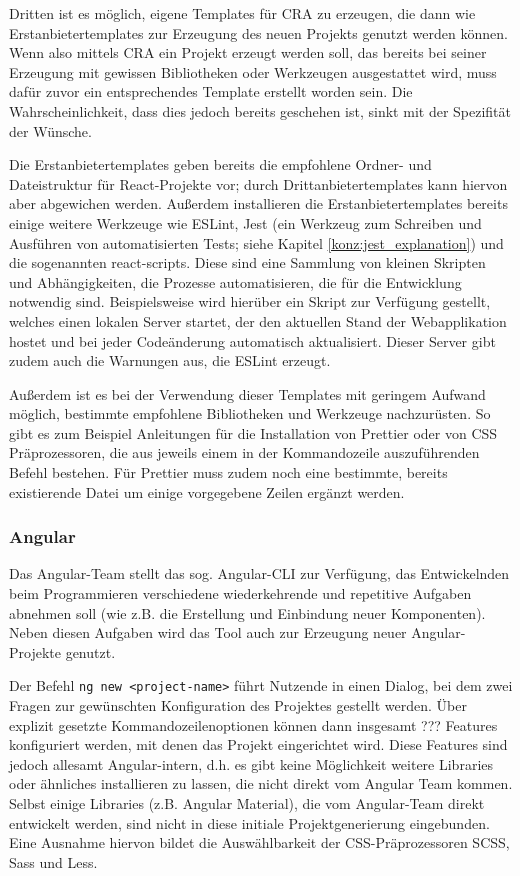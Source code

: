 Dritten ist es möglich, eigene Templates für \gls{CRA} zu erzeugen, die dann wie Erstanbietertemplates zur Erzeugung des neuen Projekts genutzt werden können. Wenn also mittels \gls{CRA} ein Projekt erzeugt werden soll, das bereits bei seiner Erzeugung mit gewissen Bibliotheken oder Werkzeugen ausgestattet wird, muss dafür zuvor ein entsprechendes Template erstellt worden sein. Die Wahrscheinlichkeit, dass dies jedoch bereits geschehen ist, sinkt mit der Spezifität der Wünsche.

Die Erstanbietertemplates geben bereits die empfohlene Ordner- und Dateistruktur für React-Projekte vor; durch Drittanbietertemplates kann hiervon aber abgewichen werden. Außerdem installieren die Erstanbietertemplates bereits einige weitere Werkzeuge wie ESLint, Jest (ein Werkzeug zum Schreiben und Ausführen von automatisierten Tests; siehe Kapitel \ref{konz:jest_explanation}) und die sogenannten react-scripts. Diese sind eine Sammlung von kleinen Skripten und Abhängigkeiten, die Prozesse automatisieren, die für die Entwicklung notwendig sind. Beispielsweise wird hierüber ein Skript zur Verfügung gestellt, welches einen lokalen Server startet, der den aktuellen Stand der Webapplikation hostet und bei jeder Codeänderung automatisch aktualisiert. Dieser Server gibt zudem auch die Warnungen aus, die ESLint erzeugt.

Außerdem ist es bei der Verwendung dieser Templates mit geringem Aufwand möglich, bestimmte empfohlene Bibliotheken und Werkzeuge nachzurüsten. So gibt es zum Beispiel Anleitungen für die Installation von Prettier oder von CSS Präprozessoren, die aus jeweils einem in der Kommandozeile auszuführenden Befehl bestehen. Für Prettier muss zudem noch eine bestimmte, bereits existierende Datei um einige vorgegebene Zeilen ergänzt werden.

\subsubsection{Angular}
Das Angular-Team stellt das sog. Angular-\gls{CLI} zur Verfügung, das Entwickelnden beim Programmieren verschiedene wiederkehrende und repetitive Aufgaben abnehmen soll (wie z.B. die Erstellung und Einbindung neuer Komponenten). Neben diesen Aufgaben wird das Tool auch zur Erzeugung neuer Angular-Projekte genutzt.

Der Befehl \verb|ng new <project-name>| führt Nutzende in einen Dialog, bei dem zwei Fragen zur gewünschten Konfiguration des Projektes gestellt werden. Über explizit gesetzte Kommandozeilenoptionen können dann insgesamt ??? Features konfiguriert werden, mit denen das Projekt eingerichtet wird. Diese Features sind jedoch allesamt Angular-intern, d.h. es gibt keine Möglichkeit weitere Libraries oder ähnliches installieren zu lassen, die nicht direkt vom Angular Team kommen. Selbst einige Libraries (z.B. Angular Material), die vom Angular-Team direkt entwickelt werden, sind nicht in diese initiale Projektgenerierung eingebunden. Eine Ausnahme hiervon bildet die Auswählbarkeit der CSS-Präprozessoren SCSS, Sass und Less.

